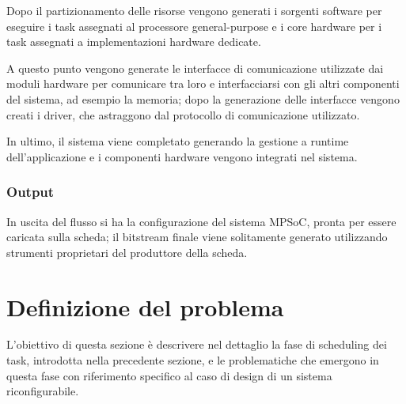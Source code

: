 Dopo il partizionamento delle risorse vengono generati i sorgenti software per eseguire i task
assegnati al processore general-purpose e i core hardware per i task assegnati a implementazioni hardware dedicate.

A questo punto vengono generate le interfacce di comunicazione utilizzate dai moduli hardware per comunicare tra loro
e interfacciarsi con gli altri componenti del sistema, ad esempio la memoria; dopo la generazione delle interfacce
vengono creati i driver, che astraggono dal protocollo di comunicazione utilizzato.

In ultimo, il sistema viene completato generando la gestione a runtime dell'applicazione e i componenti
hardware vengono integrati nel sistema.

\subsubsection{Output}
In uscita del flusso si ha la configurazione del sistema MPSoC, pronta per essere caricata sulla scheda;
il bitstream finale viene solitamente generato utilizzando strumenti proprietari del produttore della scheda.



\section{Definizione del problema}
\label{sec:definizioneProblema}
L'obiettivo di questa sezione \`e descrivere nel dettaglio la fase di scheduling dei task, introdotta
nella precedente sezione, e le problematiche che emergono in questa fase con riferimento
specifico al caso di design di un sistema riconfigurabile.


